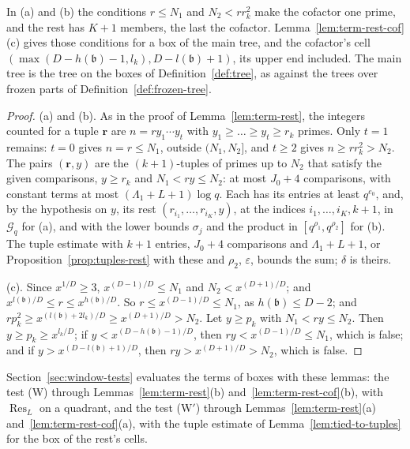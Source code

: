 \documentclass[11pt]{article}
\theoremstyle{definition}
\begin{document}
In (a) and (b) the conditions $r \le N_1$ and $N_2 < r r_k^2$ make the cofactor one prime, and the rest has $K + 1$
members, the last the cofactor. Lemma~\ref{lem:term-rest-cof}(c) gives those conditions for a box of the main tree,
and the cofactor's cell $(\max(D - h(\mathfrak b) - 1, l_k), D - l(\mathfrak b) + 1)$, its upper end included. The
main tree is the tree on the boxes of Definition~\ref{def:tree}, as against the trees over frozen parts of
Definition~\ref{def:frozen-tree}.

\begin{proof}
(a) and (b). As in the proof of Lemma~\ref{lem:term-rest}, the integers counted for a tuple $\mathbf r$ are $n = r y_1
\cdots y_t$
with $y_1 \ge \dots \ge y_t \ge r_k$ primes. Only $t = 1$ remains: $t = 0$ gives $n = r \le N_1$, outside $(N_1, N_2]$,
and $t \ge 2$ gives $n \ge r r_k^2 > N_2$. The pairs $(\mathbf r, y)$ are the $(k + 1)$-tuples of primes up to $N_2$
that satisfy the given comparisons, $y \ge r_k$ and $N_1 < ry \le N_2$: at most $J_0 + 4$ comparisons, with constant
terms at most $(\Lambda_1 + L + 1)\log q$. Each has its entries at least $q^{e_0}$, and, by the hypothesis on $y$, its
rest $(r_{i_1}, \dots, r_{i_K}, y)$, at the indices $i_1, \dots, i_K, k + 1$, in $\mathcal G_q$ for (a), and with the
lower bounds $\sigma_j$ and the product in $[q^{\rho_1}, q^{\rho_2}]$ for (b). The tuple estimate with $k + 1$ entries,
$J_0 + 4$ comparisons and $\Lambda_1 + L + 1$, or Proposition~\ref{prop:tuples-rest} with these and $\rho_2$,
$\varepsilon$, bounds the sum; $\delta$ is theirs.

(c). Since $x^{1/D} \ge 3$, $x^{(D - 1)/D} \le N_1$ and $N_2 < x^{(D + 1)/D}$; and $x^{l(\mathfrak b)/D} \le r \le
x^{h(\mathfrak b)/D}$. So $r \le x^{(D - 1)/D} \le N_1$, as $h(\mathfrak b) \le D - 2$; and $r p_k^2 \ge x^{(l(\mathfrak
b) + 2l_k)/D} \ge x^{(D + 1)/D} > N_2$. Let $y \ge p_k$ with $N_1 < ry \le N_2$. Then $y \ge p_k \ge x^{l_k/D}$; if $y
< x^{(D - h(\mathfrak b) - 1)/D}$, then $ry < x^{(D - 1)/D} \le N_1$, which is false; and if $y > x^{(D - l(\mathfrak b)
+ 1)/D}$, then $ry > x^{(D + 1)/D} > N_2$, which is false.
\end{proof}

Section~\ref{sec:window-tests} evaluates the terms of boxes with these lemmas: the test (W) through
Lemmas~\ref{lem:term-rest}(b) and~\ref{lem:term-rest-cof}(b), with $\operatorname{Res}_L$ on a quadrant, and the test
(W$'$) through Lemmas~\ref{lem:term-rest}(a) and~\ref{lem:term-rest-cof}(a), with the tuple estimate of
Lemma~\ref{lem:tied-to-tuples} for the box of the rest's cells.
\end{document}
